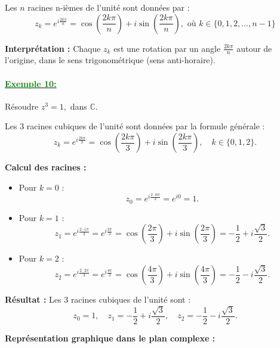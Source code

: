 \documentclass[12pt]{article}
\begin{document}
Les \(n\) racines n-ièmes de l’unité sont données par :
\[
z_k = e^{i\frac{2k\pi}{n}} = \cos\left(\frac{2k\pi}{n}\right) + i\sin\left(\frac{2k\pi}{n}\right), \text{ où } k \in \{0, 1, 2, \ldots, n-1\}
\]

\textbf{Interprétation :} Chaque \(z_k\) est une rotation par un angle \(\frac{2k\pi}{n}\) autour de l’origine, dans le sens trigonométrique (sens anti-horaire). 

\paragraph{\underline{\textbf{\textcolor{green}{Exemple 10: }}}}

Résoudre \( z^3 = 1, \) dans \( \mathbb{C} \).

Les \(3\) racines cubiques de l’unité sont données par la formule générale :
\[
z_k = e^{i\frac{2k\pi}{3}} = \cos\left(\frac{2k\pi}{3}\right) + i\sin\left(\frac{2k\pi}{3}\right), \quad k \in \{0, 1, 2\}.
\]

\textbf{Calcul des racines :}
\begin{itemize}
    \item Pour \(k = 0\) : 
    \[
    z_0 = e^{i\frac{2\cdot 0\pi}{3}} = e^{i0} = 1.
    \]
    \item Pour \(k = 1\) : 
    \[
    z_1 = e^{i\frac{2\cdot 1\pi}{3}} = e^{i\frac{2\pi}{3}} = \cos\left(\frac{2\pi}{3}\right) + i\sin\left(\frac{2\pi}{3}\right) = -\frac{1}{2} + i\frac{\sqrt{3}}{2}.
    \]
    \item Pour \(k = 2\) : 
    \[
    z_2 = e^{i\frac{2\cdot 2\pi}{3}} = e^{i\frac{4\pi}{3}} = \cos\left(\frac{4\pi}{3}\right) + i\sin\left(\frac{4\pi}{3}\right) = -\frac{1}{2} - i\frac{\sqrt{3}}{2}.
    \]
\end{itemize}

\textbf{Résultat :} Les \(3\) racines cubiques de l’unité sont :
\[
z_0 = 1, \quad z_1 = -\frac{1}{2} + i\frac{\sqrt{3}}{2}, \quad z_2 = -\frac{1}{2} - i\frac{\sqrt{3}}{2}.
\]

\textbf{Représentation graphique dans le plan complexe :}

\begin{center}
\end{center}
\end{document}
